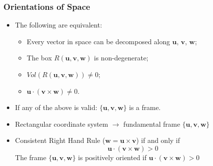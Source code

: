 \begin{frame}
  \frametitle{Orientations of Space}

\begin{itemize}
 \item The following are equivalent:
\begin{itemize}
  \item Every vector in space can be decomposed along $\textbf{u}$, $\textbf{v}$, $\textbf{w}$;
  \item The box $R(\textbf{u},\textbf{v},\textbf{w})$ is non-degenerate;
  \item $Vol(R(\textbf{u},\textbf{v},\textbf{w})) \neq 0$;
  \item $\textbf{u} \cdot (\textbf{v} \times \textbf{w}) \neq 0$.
\end{itemize}
%
\item \pause If any of the above is valid: $\{ \textbf{u}, \textbf{v}, \textbf{w}\}$ is a frame.

\item Rectangular coordinate system $\to$ fundamental frame $\{ \textbf{u}, \textbf{v}, \textbf{w}\}$

\item Consistent Right Hand Rule ($\textbf{w}=\textbf{u} \times \textbf{v}$) if and only if
%
$$\textbf{u} \cdot (\textbf{v} \times \textbf{w}) >0$$
%
The frame $\{ \textbf{u}, \textbf{v}, \textbf{w}\}$ is positively oriented if
$\textbf{u} \cdot (\textbf{v} \times \textbf{w}) >0$
%
\end{itemize}

\end{frame}